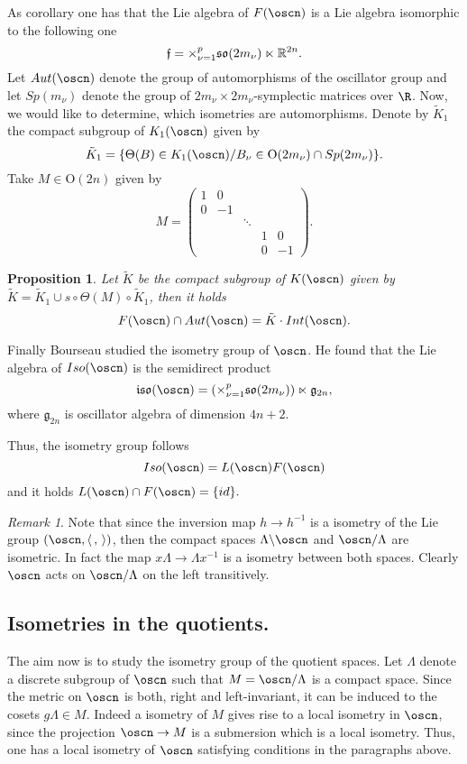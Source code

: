 \documentclass[12pt]{amsart}
\newcommand{\lela}{\left \langle}
\newcommand{\rira}{\right \rangle}
\theoremstyle{plain}
\newtheorem{prop}[thm]{Proposition}
\theoremstyle{definition}
\theoremstyle{remark}
\newtheorem{rem}{Remark}
\begin{document}
   
As corollary one has that the Lie algebra of $F(\oscn)$ is a Lie algebra isomorphic to the following one
$$\mathfrak f ={\Large \times}_{\nu=1}^p \mathfrak{so}(2m_{\nu}) \ltimes \mathbb R^{2n}.$$
    Let $Aut(\oscn)$ denote the group of automorphisms of the oscillator group and let $Sp(m_{\nu})$ denote the group of $2m_{\nu}\times 2m_{\nu}$-symplectic matrices over $\R$. Now, we would like to determine, which isometries are automorphisms. Denote by $\tilde{K}_1$ the compact subgroup of $K_1(\oscn)$ given by 
     $$\tilde{K}_1=\{\Theta(B)\in K_1(\oscn)/B_{\nu}\in \mathrm{O}(2m_{\nu})\cap Sp(2m_{\nu})\}.$$
	Take $M\in \mathrm{O}(2n)$ given by
	$$M=\left( \begin{matrix}
	1 & 0 & & &\\
	0 & -1 & & &\\
	& & \ddots & &\\
	& & & 1 & 0\\
	& & & 0 & -1
	\end{matrix}
	\right).
	$$
	\begin{prop}
		Let $\tilde{K}$ be the compact subgroup of $K(\oscn)$ given by
	$\tilde{K}=\tilde{K}_1 \cup s\circ \Theta(M) \circ \tilde{K}_1$, then it holds
	$$F(\oscn)\cap Aut(\oscn)=\tilde{K}\cdot Int(\oscn).$$
	\end{prop}
Finally Bourseau studied the isometry group of $\oscn$. He found that
the Lie algebra of $Iso(\oscn)$ is the semidirect product
$$\mathfrak{iso}(\oscn)=(\times_{\nu=1}^p \mathfrak{so}(2m_{\nu}))\ltimes \mathfrak g_{2n},$$
where $\mathfrak{g}_{2n}$ is oscillator algebra of dimension $4n+2$. 

Thus, the isometry group follows 
$$Iso(\oscn)=L(\oscn) F(\oscn)$$
 and it holds $L(\oscn)\cap F(\oscn)=\{id\}.$


\begin{rem}
	Note that since the inversion map $h\to h^{-1}$ is a isometry of the Lie group  $(\oscn, \lela\,,\,\rira)$, then the compact spaces $\Lambda \backslash \oscn$ and $\oscn/\Lambda$ are isometric. In fact the map $x\Lambda \to \Lambda x^{-1}$ is a isometry between both spaces. Clearly $\oscn$ acts on $\oscn/\Lambda$ on the left transitively.
\end{rem}

\subsection{Isometries in the quotients. } The aim now is to study the isometry group of the quotient spaces. Let $\Lambda$ denote a discrete subgroup of $\oscn$ such that  $M=\oscn/\Lambda$ is a compact space. Since the metric on $\oscn$ is both, right and left-invariant, it can be induced to the cosets $g\Lambda\in M$. Indeed a isometry of $M$ gives rise to a local isometry in $\oscn$, since the projection $\oscn \to M$ is a submersion which is a local isometry. Thus, one has a local isometry of $\oscn$ satisfying conditions in the paragraphs above. 
\end{document}
